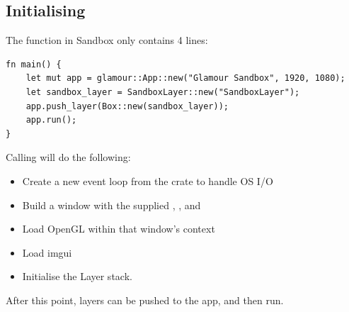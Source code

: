 \subsection{Initialising}
The  function in Sandbox only contains 4 lines:
\begin{verbatim}
fn main() {
    let mut app = glamour::App::new("Glamour Sandbox", 1920, 1080);
    let sandbox_layer = SandboxLayer::new("SandboxLayer");
    app.push_layer(Box::new(sandbox_layer));
    app.run();
}
\end{verbatim}
Calling  will do the following:
\begin{itemize}
  \item Create a new event loop from the  crate to handle OS I/O
  \item Build a window with the supplied , , and 
  \item Load OpenGL within that window's context
  \item Load imgui
  \item Initialise the Layer stack.
\end{itemize}
After this point, layers can be pushed to the app, and then run.

